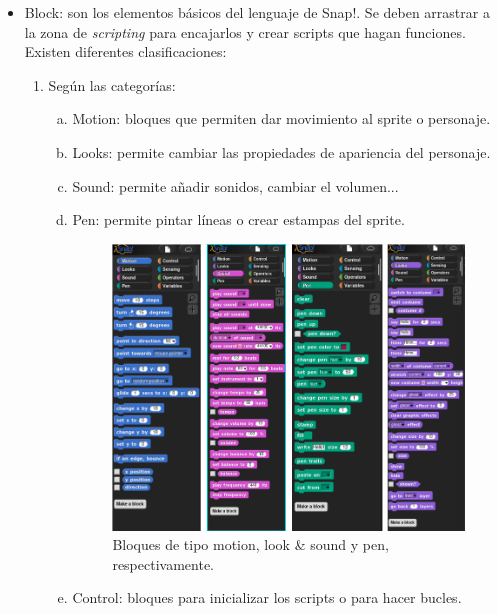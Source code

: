 \documentclass[a4paper, 12pt]{book}
\begin{document}
\begin{itemize}
     \item Block: son los elementos básicos del lenguaje de Snap!. Se deben arrastrar a la zona de \textit{scripting} para encajarlos y crear scripts que hagan funciones. Existen diferentes clasificaciones:
     
     \begin{enumerate}[1)]
        \item Según las categorías:
   
            \begin{enumerate}[a)]
                \item Motion: bloques que permiten dar movimiento al sprite o personaje.
                \item Looks: permite cambiar las propiedades de apariencia del personaje.
                \item Sound: permite añadir sonidos, cambiar el volumen...
                \item Pen: permite pintar líneas o crear estampas del sprite.
                \\
                    \begin{figure}[h]
                        \centering
                        \includegraphics[scale=0.45]{img/4-blocks.png}
                        \caption{Bloques de tipo motion, look \&  sound y pen, respectivamente.}
                        \label{figura:bloque1}
                    \end{figure}
                \item Control: bloques para inicializar los scripts o para hacer bucles.

\end{enumerate}
\end{enumerate}
\end{itemize}
\end{document}
